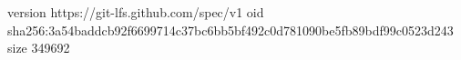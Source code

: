 version https://git-lfs.github.com/spec/v1
oid sha256:3a54baddcb92f6699714c37bc6bb5bf492c0d781090be5fb89bdf99c0523d243
size 349692
